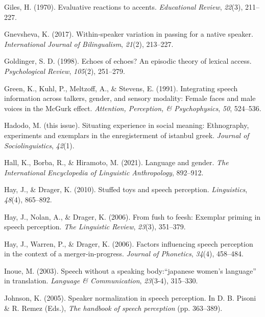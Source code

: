 \documentclass[
  letterpaper,
  DIV=11,
  numbers=noendperiod]{scrartcl}
\newlength{\cslhangindent}
\newenvironment{CSLReferences}[2] %
 {\begin{list}{}{%
  \setlength{\itemindent}{0pt}
  \setlength{\leftmargin}{0pt}
  \setlength{\parsep}{0pt}
  \ifodd #1
   \setlength{\leftmargin}{\cslhangindent}
   \setlength{\itemindent}{-1\cslhangindent}
  \fi
  \setlength{\itemsep}{#2\baselineskip}}}
 {\end{list}}
\begin{document}
\begin{CSLReferences}{1}{0}
Giles, H. (1970). Evaluative reactions to accents. \emph{Educational
Review}, \emph{22}(3), 211--227.

Gnevsheva, K. (2017). Within-speaker variation in passing for a native
speaker. \emph{International Journal of Bilingualism}, \emph{21}(2),
213--227.

Goldinger, S. D. (1998). Echoes of echoes? An episodic theory of lexical
access. \emph{Psychological Review}, \emph{105}(2), 251--279.

Green, K., Kuhl, P., Meltzoff, A., \& Stevens, E. (1991). Integrating
speech information across talkers, gender, and sensory modality: Female
faces and male voices in the McGurk effect. \emph{Attention, Perception,
\& Psychophysics}, \emph{50}, 524--536.

Hadodo, M. (this issue). Situating experience in social meaning:
Ethnography, experiments and exemplars in the enregisterment of istanbul
greek. \emph{Journal of Sociolinguistics}, \emph{42}(1).

Hall, K., Borba, R., \& Hiramoto, M. (2021). Language and gender.
\emph{The International Encyclopedia of Linguistic Anthropology},
892--912.

Hay, J., \& Drager, K. (2010). Stuffed toys and speech perception.
\emph{Linguistics}, \emph{48}(4), 865--892.

Hay, J., Nolan, A., \& Drager, K. (2006). From fush to feesh: Exemplar
priming in speech perception. \emph{The Linguistic Review},
\emph{23}(3), 351--379.

Hay, J., Warren, P., \& Drager, K. (2006). Factors influencing speech
perception in the context of a merger-in-progress. \emph{Journal of
Phonetics}, \emph{34}(4), 458--484.

Inoue, M. (2003). Speech without a speaking body:{``japanese women's
language''} in translation. \emph{Language \& Communication},
\emph{23}(3-4), 315--330.

Johnson, K. (2005). Speaker normalization in speech perception. In D. B.
Pisoni \& R. Remez (Eds.), \emph{The handbook of speech perception} (pp.
363--389).


\end{CSLReferences}
\end{document}
